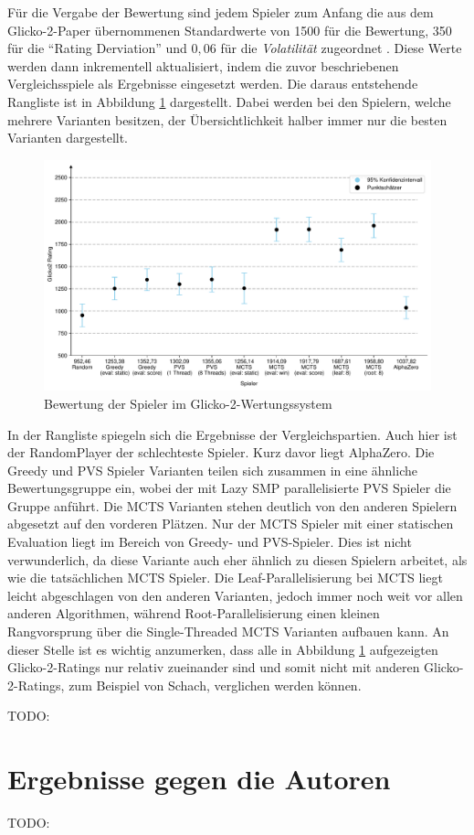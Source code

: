 Für die Vergabe der Bewertung sind jedem Spieler zum Anfang die aus dem Glicko-2-Paper übernommenen Standardwerte von 1500 für die Bewertung, 350 für die \enquote{Rating Derviation} und $0{,}06$ für die \emph{Volatilität} zugeordnet \cite[S. 2]{2022.Glicko2}. Diese Werte werden dann inkrementell aktualisiert, indem die zuvor beschriebenen Vergleichsspiele als Ergebnisse eingesetzt werden. Die daraus entstehende Rangliste ist in Abbildung \ref{fig:player-ratings} dargestellt. Dabei werden bei den Spielern, welche mehrere Varianten besitzen, der Übersichtlichkeit halber immer nur die besten Varianten dargestellt.

\begin{figure}[!ht]
    \centering
    \includegraphics[width=\textwidth]{res/pictures/plots/player-ratings.pdf}
    \caption{Bewertung der Spieler im Glicko-2-Wertungssystem}
    \label{fig:player-ratings}
\end{figure}

In der Rangliste spiegeln sich die Ergebnisse der Vergleichspartien. Auch hier ist der RandomPlayer der schlechteste Spieler. Kurz davor liegt AlphaZero. Die Greedy und \ac{PVS} Spieler Varianten teilen sich zusammen in eine ähnliche Bewertungsgruppe ein, wobei der mit Lazy \ac{SMP} parallelisierte \ac{PVS} Spieler die Gruppe anführt. Die \ac{MCTS} Varianten stehen deutlich von den anderen Spielern abgesetzt auf den vorderen Plätzen. Nur der \ac{MCTS} Spieler mit einer statischen Evaluation liegt im Bereich von Greedy- und \ac{PVS}-Spieler. Dies ist nicht verwunderlich, da diese Variante auch eher ähnlich zu diesen Spielern arbeitet, als wie die tatsächlichen \ac{MCTS} Spieler. Die Leaf-Parallelisierung bei \ac{MCTS} liegt leicht abgeschlagen von den anderen Varianten, jedoch immer noch weit vor allen anderen Algorithmen, während Root-Parallelisierung einen kleinen Rangvorsprung über die Single-Threaded \ac{MCTS} Varianten aufbauen kann. An dieser Stelle ist es wichtig anzumerken, dass alle in Abbildung \ref{fig:player-ratings} aufgezeigten Glicko-2-Ratings nur relativ zueinander sind und somit nicht mit anderen Glicko-2-Ratings, zum Beispiel von Schach, verglichen werden können.

TODO:

\section{Ergebnisse gegen die Autoren}

TODO:
